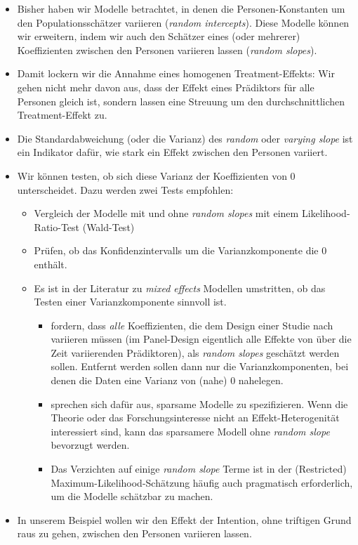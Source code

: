 \documentclass[
]{book}
\providecommand{\tightlist}{%
  \setlength{\itemsep}{0pt}\setlength{\parskip}{0pt}}
\begin{document}
\begin{itemize}
\tightlist
\item
  Bisher haben wir Modelle betrachtet, in denen die Personen-Konstanten um den Populationsschätzer variieren (\emph{random intercepts}). Diese Modelle können wir erweitern, indem wir auch den Schätzer eines (oder mehrerer) Koeffizienten zwischen den Personen variieren lassen (\emph{random slopes}).
\item
  Damit lockern wir die Annahme eines homogenen Treatment-Effekts: Wir gehen nicht mehr davon aus, dass der Effekt eines Prädiktors für alle Personen gleich ist, sondern lassen eine Streuung um den durchschnittlichen Treatment-Effekt zu.
\item
  Die Standardabweichung (oder die Varianz) des \emph{random} oder \emph{varying slope} ist ein Indikator dafür, wie stark ein Effekt zwischen den Personen variiert.
\item
  Wir können testen, ob sich diese Varianz der Koeffizienten von 0 unterscheidet. Dazu werden zwei Tests empfohlen:

  \begin{itemize}
  \tightlist
  \item
    Vergleich der Modelle mit und ohne \emph{random slopes} mit einem Likelihood-Ratio-Test (Wald-Test)
  \item
    Prüfen, ob das Konfidenzintervalls um die Varianzkomponente die 0 enthält.
  \item
    Es ist in der Literatur zu \emph{mixed effects} Modellen umstritten, ob das Testen einer Varianzkomponente sinnvoll ist.

    \begin{itemize}
    \tightlist
    \item
      \citet{barrRandomEffectsStructure2013} fordern, dass \emph{alle} Koeffizienten, die dem Design einer Studie nach variieren müssen (im Panel-Design eigentlich alle Effekte von über die Zeit variierenden Prädiktoren), als \emph{random slopes} geschätzt werden sollen. Entfernt werden sollen dann nur die Varianzkomponenten, bei denen die Daten eine Varianz von (nahe) 0 nahelegen.
    \item
      \citet{matuschekBalancingTypeError2017} sprechen sich dafür aus, sparsame Modelle zu spezifizieren. Wenn die Theorie oder das Forschungsinteresse nicht an Effekt-Heterogenität interessiert sind, kann das sparsamere Modell ohne \emph{random slope} bevorzugt werden.
    \item
      Das Verzichten auf einige \emph{random slope} Terme ist in der (Restricted) Maximum-Likelihood-Schätzung häufig auch pragmatisch erforderlich, um die Modelle schätzbar zu machen.
    \end{itemize}
  \end{itemize}
\item
  In unserem Beispiel wollen wir den Effekt der Intention, ohne triftigen Grund raus zu gehen, zwischen den Personen variieren lassen.


\end{itemize}
\end{document}
